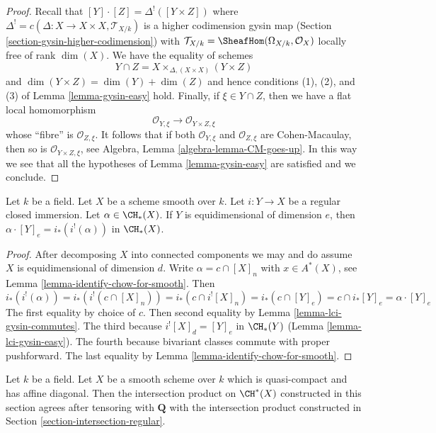 \begin{proof}
Recall that $[Y] \cdot [Z] = \Delta^!([Y \times Z])$ where
$\Delta^! = c(\Delta : X \to X \times X, \mathcal{T}_{X/k})$
is a higher codimension gysin map
(Section \ref{section-gysin-higher-codimension}) with
$\mathcal{T}_{X/k} = \SheafHom(\Omega_{X/k}, \mathcal{O}_X)$
locally free of rank $\dim(X)$. We have the equality of schemes
$$
Y \cap Z = X \times_{\Delta, (X \times X)} (Y \times Z)
$$
and $\dim(Y \times Z) = \dim(Y) + \dim(Z)$ and hence conditions 
(1), (2), and (3) of Lemma \ref{lemma-gysin-easy} hold.
Finally, if $\xi \in Y \cap Z$, then we have a flat local
homomorphism
$$
\mathcal{O}_{Y, \xi} \longrightarrow
\mathcal{O}_{Y \times Z, \xi}
$$
whose ``fibre'' is $\mathcal{O}_{Z, \xi}$. It follows that if both
$\mathcal{O}_{Y, \xi}$ and $\mathcal{O}_{Z, \xi}$
are Cohen-Macaulay, then so is $\mathcal{O}_{Y \times Z, \xi}$, see
Algebra, Lemma \ref{algebra-lemma-CM-goes-up}.
In this way we see that all the hypotheses of
Lemma \ref{lemma-gysin-easy} are satisfied and we conclude.
\end{proof}

\begin{lemma}
\label{lemma-intersect-regularly-embedded}
Let $k$ be a field. Let $X$ be a scheme smooth over $k$. Let $i : Y \to X$ be
a regular closed immersion. Let $\alpha \in \CH_*(X)$. If $Y$ is
equidimensional of dimension $e$, then
$\alpha \cdot [Y]_e = i_*(i^!(\alpha))$ in $\CH_*(X)$.
\end{lemma}

\begin{proof}
After decomposing $X$ into connected components we may and do assume $X$
is equidimensional of dimension $d$. Write $\alpha = c \cap [X]_n$
with $x \in A^*(X)$, see Lemma \ref{lemma-identify-chow-for-smooth}. Then
$$
i_*(i^!(\alpha)) = i_*(i^!(c \cap [X]_n)) =
i_*(c \cap i^![X]_n) = i_*(c \cap [Y]_e) =
c \cap i_*[Y]_e = \alpha \cdot [Y]_e
$$
The first equality by choice of $c$. Then second equality by
Lemma \ref{lemma-lci-gysin-commutes}. The third because
$i^![X]_d = [Y]_e$ in $\CH_*(Y)$ (Lemma \ref{lemma-lci-gysin-easy}).
The fourth because bivariant classes commute with proper pushforward.
The last equality by Lemma \ref{lemma-identify-chow-for-smooth}.
\end{proof}

\begin{lemma}
\label{lemma-intersection-regular-smooth}
Let $k$ be a field. Let $X$ be a smooth scheme over $k$ which is
quasi-compact and has affine diagonal. Then the intersection
product on $\CH^*(X)$ constructed in this section agrees
after tensoring with $\mathbf{Q}$ with the intersection product
constructed in Section \ref{section-intersection-regular}.
\end{lemma}

